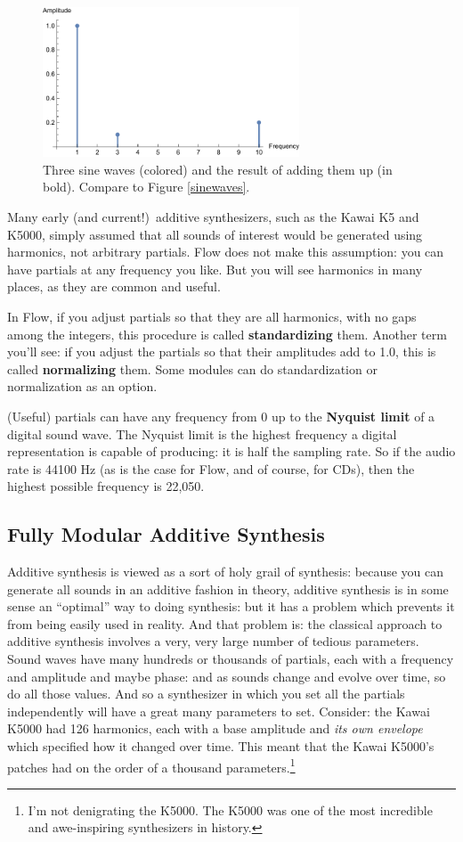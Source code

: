 \documentclass{article}
\newcommand\name{Flow}
\begin{document}
\begin{figure}
\includegraphics[width=3in]{partials}
\caption{Three sine waves (colored) and the result of adding them up (in bold).  Compare to Figure \ref{sinewaves}.}
\label{partials}
\end{figure}

Many early (and current!)\ additive synthesizers, such as the Kawai K5 and K5000, simply assumed that all sounds of interest would be generated using harmonics, not arbitrary partials.   {\name} does not make this assumption: you can have partials at any frequency you like.  But you will see harmonics in many places, as they are common and useful.

In {\name}, if you adjust partials so that they are all harmonics, with no gaps among the integers, this procedure is called {\bf standardizing} them.  Another term you'll see: if you adjust the partials so that their amplitudes add to 1.0, this is called {\bf normalizing} them.  Some modules can do standardization or normalization as an option.

(Useful) partials can have any frequency from 0 up to the {\bf Nyquist limit} of a digital sound wave.  The Nyquist limit is the highest frequency a digital representation is capable of producing: it is half the sampling rate.  So if the audio rate is 44100 Hz (as is the case for {\name}, and of course, for CDs), then the highest possible frequency is 22,050.

\subsection{Fully Modular Additive Synthesis}  Additive synthesis is viewed as a sort of holy grail of synthesis: because you can generate all sounds in an additive fashion in theory, additive synthesis is in some sense an ``optimal'' way to doing synthesis: but it has a problem which prevents it from being easily used in reality.   And that problem is: the classical approach to additive synthesis involves a very, very large number of tedious parameters.  Sound waves have many hundreds or thousands of partials, each with a frequency and amplitude and maybe phase: and as sounds change and evolve over time, so do all those values.  And so a synthesizer in which you set all the partials independently will have a great many parameters to set.  Consider: the Kawai K5000 had 126 harmonics, each with a base amplitude and {\it its own envelope} which specified how it changed over time.  This meant that the Kawai K5000's patches had on the order of a thousand parameters.\footnote{I'm not denigrating the K5000.  The K5000 was one of the most incredible and awe-inspiring synthesizers in history.}
\end{document}
